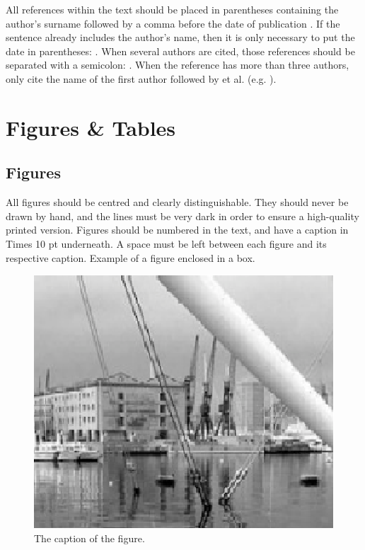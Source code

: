 \documentclass[10pt, a4paper]{article}
\begin{document}
All references within the text should be placed in parentheses containing the author's surname followed by a comma before the date of publication \cite{Martin-90}. If the sentence already includes the author's name, then it is only necessary to put the date in parentheses: . When several authors are cited, those references should be separated with a semicolon: \cite{Martin-90,CastorPollux-92}. When the reference has more than three authors, only cite the name of the first author followed by et al. (e.g. \cite{Superman-Batman-Catwoman-Spiderman-00}).

\section{Figures \& Tables}
\subsection{Figures}

All figures should be centred and clearly distinguishable. They should never be drawn by hand, and the lines must be very dark in order to ensure a high-quality printed version. Figures should be numbered in the text, and have a caption in Times 10 pt underneath. A space must be left between each figure and its respective caption.
Example of a figure enclosed in a box.

\begin{figure}[h]
\begin{center}
\includegraphics[scale=0.5]{image1.eps} 
\caption{The caption of the figure.}
\label{fig.1}
\end{center}
\end{figure}
\end{document}
